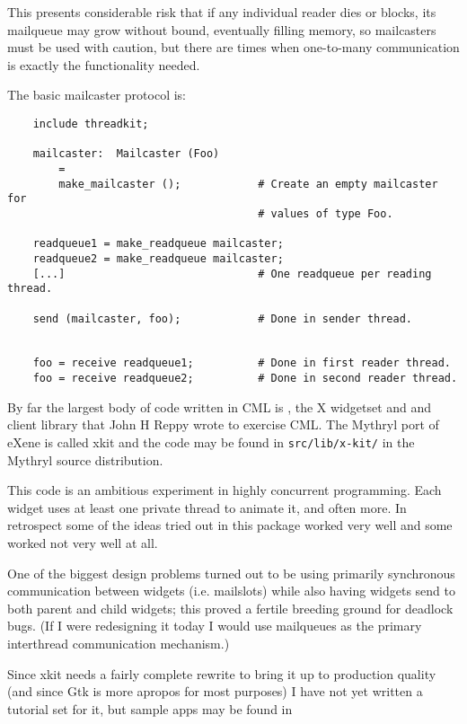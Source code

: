 \begin{itemize}
\begin{itemize}
This presents considerable risk that if any individual 
reader dies or blocks, its mailqueue may grow without 
bound, eventually filling memory, so mailcasters must 
be used with caution, but there are times when one-to-many 
communication is exactly the functionality needed. 

The basic mailcaster protocol is: 

\begin{verbatim}
    include threadkit;

    mailcaster:  Mailcaster (Foo)
        =
        make_mailcaster ();            # Create an empty mailcaster for
                                       # values of type Foo.

    readqueue1 = make_readqueue mailcaster;
    readqueue2 = make_readqueue mailcaster;
    [...]                              # One readqueue per reading thread.

    send (mailcaster, foo);            # Done in sender thread.


    foo = receive readqueue1;          # Done in first reader thread.
    foo = receive readqueue2;          # Done in second reader thread.
\end{verbatim}

\end{itemize}
\end{itemize}


By far the largest body of code written in CML is , 
the X widgetset and and client library that John H Reppy wrote to exercise CML.
The Mythryl port of eXene is called xkit and the code may be found in {\tt src/lib/x-kit/} 
in the Mythryl source distribution.

This code is an ambitious experiment in highly concurrent programming.  Each widget uses 
at least one private thread to animate it, and often more.  In retrospect some of the 
ideas tried out in this package worked very well and some worked not very well at all. 

One of the biggest design problems turned out to be using primarily synchronous communication 
between widgets (i.e. mailslots) while also having widgets send to both parent and child 
widgets;  this proved a fertile breeding ground for deadlock bugs.  (If I were redesigning 
it today I would use mailqueues as the primary interthread communication mechanism.) 

Since xkit needs a fairly complete rewrite to bring it up to production quality 
(and since Gtk is more apropos for most purposes) I have not yet written a tutorial 
set for it, but sample apps may be found in 

